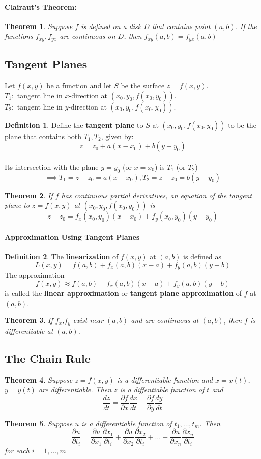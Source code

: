 \documentclass[12 pt]{article}
\newtheorem{thm}{Theorem}
\theoremstyle{definition}
\newtheorem{defn}{Definition}
\begin{document}
\paragraph{Clairaut's Theorem:} 
\begin{thm}
	Suppose $f$ is defined on a disk $D$ that contains point $(a,b)$. If the functions $f_{xy},f_{yx}$ are continuous on $D$, then $f_{xy}(a,b)=f_{yx}(a,b)$
\end{thm}
\subsection{Tangent Planes} Let $f(x,y)$ be a function and let $S$ be the surface $z=f(x,y)$. 
\\ $T_1:$ tangent line in $x$-direction at $(x_0,y_0,f(x_0,y_0))$.
\\ $T_2:$ tangent line in $y$-direction at $(x_0,y_0,f(x_0,y_0))$.
\begin{defn}
	Define the \textbf{tangent plane} to $S$ at $(x_0,y_0,f(x_0,y_0))$ to be the plane that contains both $T_1,T_2$, given by: $$z=z_0+a(x-x_0)+b(y-y_0)$$
	\\ Its intersection with the plane $y=y_0$ (or $x=x_0$) is $T_1$ (or $T_2$)
	$$\implies T_1=z-z_0=a(x-x_0),T_2=z-z_0=b(y-y_0)$$
\end{defn}
\begin{thm}
	If $f$ has continuous partial derivatives, an equation of the tangent plane to $z=f(x,y)$ at $(x_0,y_0,f(x_0,y_0))$ is $$z-z_0=f_x(x_0,y_0)(x-x_0)+f_y(x_0,y_0)(y-y_0)$$
\end{thm}
\paragraph{Approximation Using Tangent Planes}
\begin{defn}
	The \textbf{linearization} of $f(x,y)$ at $(a,b)$ is defined as $$L(x,y)=f(a,b)+f_x(a,b)(x-a)+f_y(a,b)(y-b)$$
	The approximation $$f(x,y)\approx f(a,b)+f_x(a,b)(x-a)+f_y(a,b)(y-b)$$ is called the \textbf{linear approximation} or \textbf{tangent plane approximation} of $f$ at $(a,b)$.
\end{defn}
\begin{thm}
	If $f_x$,$f_y$ exist near $(a,b)$ and are continuous at $(a,b)$, then $f$ is differentiable at $(a,b)$.
\end{thm}
\subsection{The Chain Rule}
\begin{thm}
  Suppose $z=f(x,y)$ is a differentiable function and $x=x(t)$, $y=y(t)$ are differentiable. Then $z$ is a diffentiable function of $t$ and
  $$\frac{dz}{dt}=\frac{\partial f}{\partial x}\frac{dx}{dt}+\frac{\partial f}{\partial y}\frac{dy}{dt}$$
\end{thm}
\begin{thm}
  Suppose $u$ is a differentiable function of $t_1,\ldots,t_m$. Then
  $$ \frac{\partial u}{\partial t_i}=\frac{\partial u}{\partial x_1}\frac{\partial x_1}{\partial t_i}+\frac{\partial u}{\partial x_2} \frac{\partial x_2}{\partial t_i}+\ldots + \frac{\partial u}{\partial x_n}\frac{\partial x_n}{\partial t_i}$$ for each $i=1,\ldots, m$ 
\end{thm}
\end{document}
